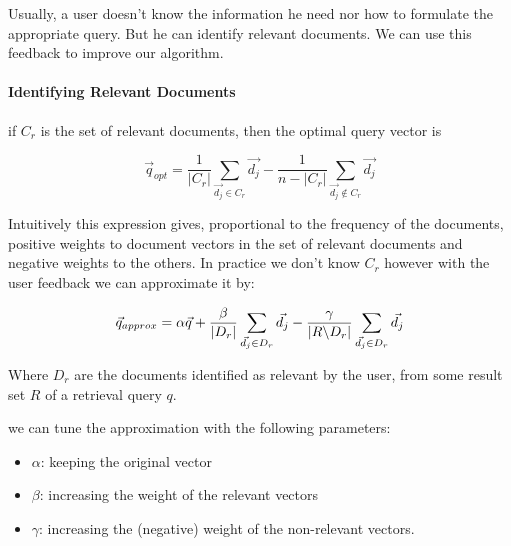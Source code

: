 Usually, a user doesn't know the information he need nor how to formulate the appropriate query. But he can identify relevant documents. We can use this feedback to improve our algorithm.
\paragraph{Identifying Relevant Documents}
if $C_r$ is the set of relevant documents, then the optimal query vector is 

\[ \vec{q}_{opt} = \frac{1}{|C_r|} \sum_{\vec{d_j} \in C_r} \vec{d_j} - \frac{1}{n-|C_r|} \sum_{\vec{d_j} \not \in C_r} \vec{d_j} \]

Intuitively this expression gives, proportional to the frequency of the documents, positive weights to document vectors in the set of relevant documents and negative weights to the others. In practice we don't know $C_r$ however with the user feedback we can approximate it by:

\[ \vec{q}_{approx} = \alpha\vec{q} + \frac{\beta}{|D_r|}\sum_{\vec{d_j} \in D_r} \vec{d_j} - \frac{\gamma}{\abs{R\symbol{92}D_r}} \sum_{\vec{d_j} \in D_r} \vec{d_j} \]

Where $D_r$ are the documents identified as relevant by the user, from some result set $R$ of a retrieval query $q$.

we can tune the approximation with the following parameters:
\begin{itemize}
\item $\alpha$: keeping the original vector
\item $\beta$: increasing the weight of the relevant vectors
\item $\gamma$: increasing the (negative) weight of the non-relevant vectors.
\end{itemize}